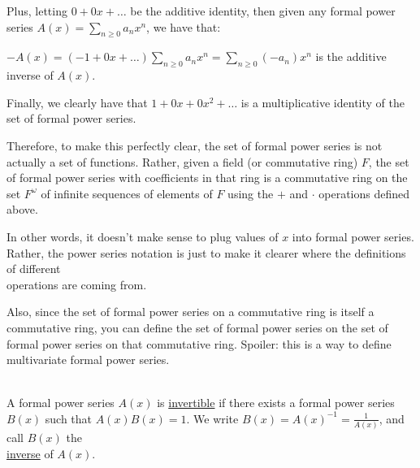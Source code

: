 \documentclass{book}
\newcommand{\myComment}{%
   \color{RawerSienna}%
   \fontsize{12}{14}\selectfont%
}
\newenvironment{myIndent}{%
   \begin{adjustwidth}{2.5em}{0em}%
}{%
   \end{adjustwidth}%
}
\newcommand{\udefine}[1]{{%
   \setulcolor{Red}%
   \setul{0.14em}{0.07em}%
   \ul{#1}%
}}
\newcommand{\mySepTwo}[1][.]{%
   {\noindent\color{#1}{\rule{6.5in}{0.5mm}}}\\%
}
\newcommand{\retTwo}{\hfill\bigbreak}
\begin{document}
Plus, letting $0 + 0x + \ldots$\phantom{a}  be the additive identity, then given any formal power series $A(x) = \sum\limits_{n \geq 0}a_n x^n$, we have that:

{\centering $-A(x) = (-1 + 0x + \ldots)\sum\limits_{n \geq 0}a_nx^n = \sum\limits_{n \geq 0}(-a_n)x^n$ is the additive inverse of $A(x)$.\retTwo\par}

Finally, we clearly have that $1 + 0x + 0x^2 + \ldots$\phantom{a} is a multiplicative identity of the set of formal power series.\retTwo

Therefore, to make this perfectly clear, the set of formal power series is not actually a set of functions. Rather, given a field (or commutative ring) $F$, the set of formal power series with coefficients in that ring is a commutative ring on the set $F^{\omega}$ of infinite sequences of elements of $F$ using the $+$ and $\cdot$ operations defined above.

\begin{myIndent}\myComment
   In other words, it doesn't make sense to plug values of $x$ into formal power series. Rather, the power series notation is just to make it clearer where the definitions of different\\ operations are coming from.\retTwo

   Also, since the set of formal power series on a commutative ring is itself a commutative ring, you can define the set of formal power series on the set of formal power series on that commutative ring. Spoiler: this is a way to define multivariate formal power series.\retTwo
\end{myIndent}

\mySepTwo

A formal power series $A(x)$ is \udefine{invertible} if there exists a formal power series $B(x)$ such that $A(x)B(x) = 1$. We write $B(x) = A(x)^{-1} = \frac{1}{A(x)}$, and call $B(x)$ the\\ [-2pt] \udefine{inverse} of $A(x)$.\retTwo
\end{document}

